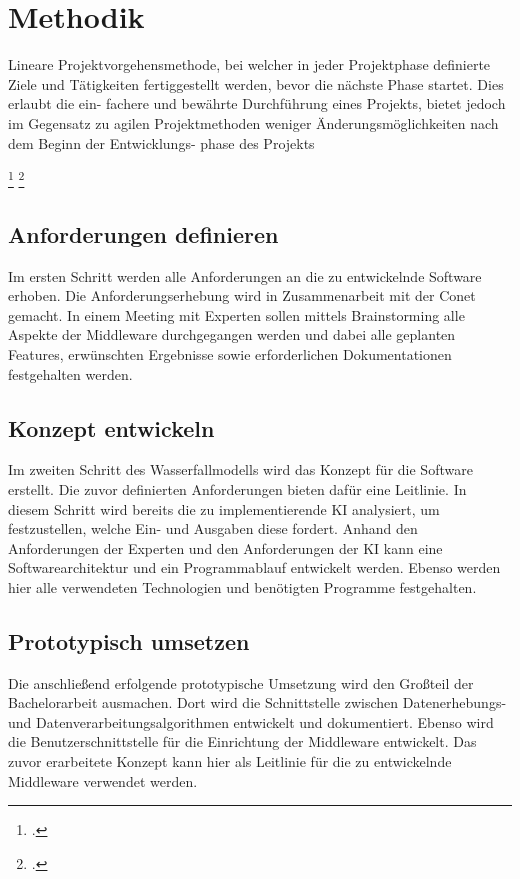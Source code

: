 \section{Methodik}
Lineare Projektvorgehensmethode, bei welcher in jeder Projektphase definierte Ziele und
Tätigkeiten fertiggestellt werden, bevor die nächste Phase startet. Dies erlaubt die ein-
fachere und bewährte Durchführung eines Projekts, bietet jedoch im Gegensatz zu agilen
Projektmethoden weniger Änderungsmöglichkeiten nach dem Beginn der Entwicklungs-
phase des Projekts

\footcite{PorathRon2020ICuI}
\footcite{harwardt2012wasserfallmodell}

\subsection{Anforderungen definieren}
Im ersten Schritt werden alle Anforderungen an die zu entwickelnde Software erhoben.
Die Anforderungserhebung wird in Zusammenarbeit mit der Conet gemacht. In einem
Meeting mit Experten sollen mittels Brainstorming alle Aspekte der Middleware durchgegangen
werden und dabei alle geplanten Features, erwünschten Ergebnisse sowie
erforderlichen Dokumentationen festgehalten werden.

\subsection{Konzept entwickeln}
Im zweiten Schritt des Wasserfallmodells wird das Konzept für die Software erstellt. Die
zuvor definierten Anforderungen bieten dafür eine Leitlinie. In diesem Schritt wird bereits
die zu implementierende KI analysiert, um festzustellen, welche Ein- und Ausgaben diese
fordert. Anhand den Anforderungen der Experten und den Anforderungen der KI kann eine
Softwarearchitektur und ein Programmablauf entwickelt werden. Ebenso werden hier alle
verwendeten Technologien und benötigten Programme festgehalten.

\subsection{Prototypisch umsetzen}
Die anschließend erfolgende prototypische Umsetzung wird den Großteil der Bachelorarbeit
ausmachen. Dort wird die Schnittstelle zwischen Datenerhebungs- und Datenverarbeitungsalgorithmen
entwickelt und dokumentiert. Ebenso wird die Benutzerschnittstelle
für die Einrichtung der Middleware entwickelt. Das zuvor erarbeitete Konzept kann hier
als Leitlinie für die zu entwickelnde Middleware verwendet werden.


